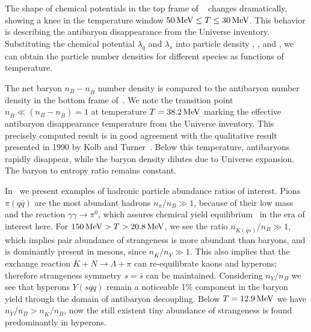 The shape of chemical potentials in the top frame of ~ changes dramatically, showing a knee in the temperature window $50\text{\,MeV}\le T\le 30\text{\,MeV}$. This behavior is describing the antibaryon disappearance from the Universe inventory. Substituting the chemical potential $\lambda_q$ and $\lambda_s$ into particle density , , and , we can obtain the particle number densities for different species as functions of temperature. 

The net baryon $n_B-n_{\overline B}$ number density is compared to the antibaryon number density in the bottom frame of~. We note the transition point $n_{\overline B}\ll(n_B-n_{\overline B})=1$ at temperature $T=38.2\text{\,MeV}$ marking the effective antibaryon disappearance temperature from the Universe inventory. This precisely computed result is in good agreement with the qualitative result presented in 1990 by Kolb and Turner~\cite{Kolb:1990vq}. Below this temperature, antibaryons rapidly disappear, while the baryon density dilutes due to Universe expansion. The baryon to entropy ratio remains constant.

In~ we present examples of hadronic particle abundance ratios of interest. Pions $\pi(q\bar q)$ are the most abundant hadrons $n_\pi/n_B\gg1$, because of their low mass and the reaction $\gamma\gamma\rightarrow\pi^0$, which assures chemical yield equilibrium~\cite{Kuznetsova:2008jt} in the era of interest here. For $150\text{\,MeV}>T>20.8\text{\,MeV}$, we see the ratio $n_{{\overline K}(\bar q s)}/n_B\gg1$, which implies pair abundance of strangeness is more abundant than baryons, and is dominantly present in mesons, since $n_{\overline K}/n_Y\gg1$. This also implies that the exchange reaction $\overline{K}+N\rightarrow \Lambda+\pi$ can re-equilibrate kaons and hyperons; therefore strangeness symmetry $s=\bar s$ can be maintained. Considering $n_Y/n_B$ we see that hyperons $Y(sqq)$ remain a noticeable 1\% component in the baryon yield through the domain of antibaryon decoupling. Below $T=12.9\text{\,MeV}$ we have $n_Y/n_B>n_{\overline K}/n_B$, now the still existent tiny abundance of strangeness is found predominantly in hyperons.

